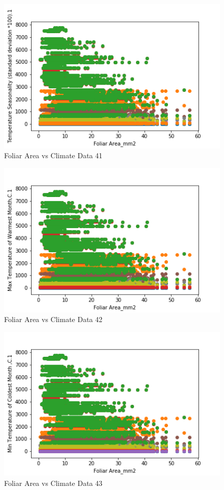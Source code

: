 \documentclass[letterpaper]{article}
\begin{document}
\begin{figure}[h]
\caption{Foliar Area vs Climate Data 41\label{fig:Foliar_Area_vs_41}}
\centering
\includegraphics[width=0.7\paperwidth]{Foliar_Area_vs_41}
\end{figure}


\begin{figure}[h]
\caption{Foliar Area vs Climate Data 42\label{fig:Foliar_Area_vs_42}}
\centering
\includegraphics[width=0.7\paperwidth]{Foliar_Area_vs_42}
\end{figure}


\begin{figure}[h]
\caption{Foliar Area vs Climate Data 43\label{fig:Foliar_Area_vs_43}}
\centering
\includegraphics[width=0.7\paperwidth]{Foliar_Area_vs_43}
\end{figure}
\end{document}
